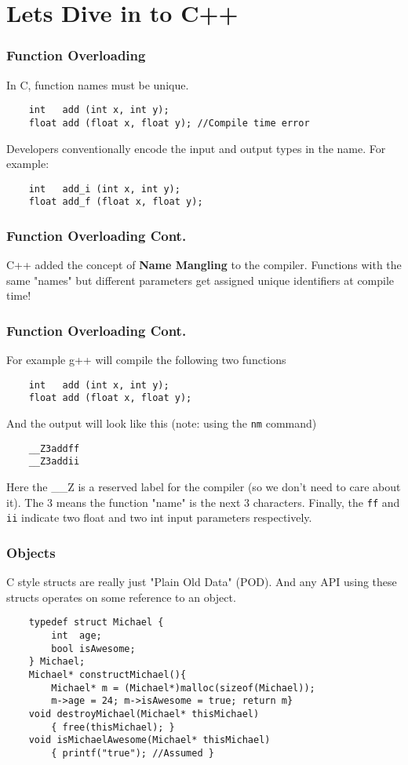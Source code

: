 \documentclass{beamer}
\begin{document}
\section{Lets Dive in to C++}

\begin{frame}[fragile]
    \frametitle{Function Overloading}
    In C, function names must be unique.
    \begin{verbatim}
    int   add (int x, int y);
    float add (float x, float y); //Compile time error
    \end{verbatim}
    Developers conventionally encode the input and output types in the name. For example:
    \begin{verbatim}
    int   add_i (int x, int y);
    float add_f (float x, float y);
    \end{verbatim}
    
\end{frame}

\begin{frame}[fragile]
    \frametitle{Function Overloading Cont.}

    C++ added the concept of \textbf{Name Mangling} to the compiler.
    Functions with the same "names" but different parameters get assigned unique identifiers at compile time!
\end{frame}    
\begin{frame}[fragile]
    \frametitle{Function Overloading Cont.}
    For example g++ will compile the following two functions

    \begin{verbatim}
    int   add (int x, int y);
    float add (float x, float y); 
    \end{verbatim}
    And the output will look like this (note: using the \texttt{nm} command)
    \begin{verbatim}
    __Z3addff
    __Z3addii
    \end{verbatim}
    Here the \_\_Z is a reserved label for the compiler (so we don't need to care about it). 
    The 3 means the function "name" is the next 3 characters. Finally, the \texttt{ff} and \texttt{ii} indicate two float and two int input parameters respectively.

\end{frame}


\begin{frame}[fragile]
    \frametitle{Objects}
    C style structs are really just "Plain Old Data" (POD).
    And any API using these structs operates on some reference to an object.

    \begin{verbatim}
    typedef struct Michael {
        int  age;
        bool isAwesome;
    } Michael;
    Michael* constructMichael(){ 
        Michael* m = (Michael*)malloc(sizeof(Michael)); 
        m->age = 24; m->isAwesome = true; return m}
    void destroyMichael(Michael* thisMichael)
        { free(thisMichael); }
    void isMichaelAwesome(Michael* thisMichael)
        { printf("true"); //Assumed }
    \end{verbatim}


\end{frame}
\end{document}
